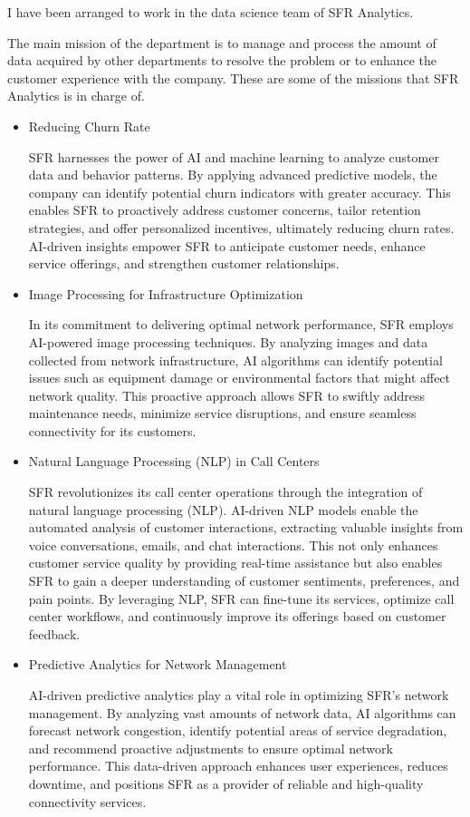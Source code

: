 I have been arranged to work in the data science team of SFR Analytics.

The main mission of the department is to manage and process the amount of data acquired by other departments to resolve the problem or to enhance the customer experience with the company. These are some of the missions that SFR Analytics is in charge of.

\begin{itemize}
    \item Reducing Churn Rate
    
SFR harnesses the power of AI and machine learning to analyze customer data and behavior patterns. By applying advanced predictive models, the company can identify potential churn indicators with greater accuracy. This enables SFR to proactively address customer concerns, tailor retention strategies, and offer personalized incentives, ultimately reducing churn rates. AI-driven insights empower SFR to anticipate customer needs, enhance service offerings, and strengthen customer relationships.

    \item Image Processing for Infrastructure Optimization
    
In its commitment to delivering optimal network performance, SFR employs AI-powered image processing techniques. By analyzing images and data collected from network infrastructure, AI algorithms can identify potential issues such as equipment damage or environmental factors that might affect network quality. This proactive approach allows SFR to swiftly address maintenance needs, minimize service disruptions, and ensure seamless connectivity for its customers.

    \item Natural Language Processing (NLP) in Call Centers
    
SFR revolutionizes its call center operations through the integration of natural language processing (NLP). AI-driven NLP models enable the automated analysis of customer interactions, extracting valuable insights from voice conversations, emails, and chat interactions. This not only enhances customer service quality by providing real-time assistance but also enables SFR to gain a deeper understanding of customer sentiments, preferences, and pain points. By leveraging NLP, SFR can fine-tune its services, optimize call center workflows, and continuously improve its offerings based on customer feedback.

    \item Predictive Analytics for Network Management
    
AI-driven predictive analytics play a vital role in optimizing SFR's network management. By analyzing vast amounts of network data, AI algorithms can forecast network congestion, identify potential areas of service degradation, and recommend proactive adjustments to ensure optimal network performance. This data-driven approach enhances user experiences, reduces downtime, and positions SFR as a provider of reliable and high-quality connectivity services.

\end{itemize}

